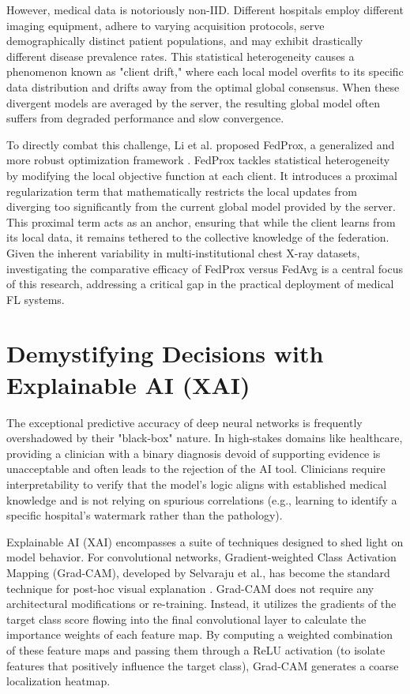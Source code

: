 \documentclass[12pt,a4paper]{report}
\begin{document}
However, medical data is notoriously non-IID. Different hospitals employ different imaging equipment, adhere to varying acquisition protocols, serve demographically distinct patient populations, and may exhibit drastically different disease prevalence rates. This statistical heterogeneity causes a phenomenon known as "client drift," where each local model overfits to its specific data distribution and drifts away from the optimal global consensus. When these divergent models are averaged by the server, the resulting global model often suffers from degraded performance and slow convergence.

To directly combat this challenge, Li et al. proposed FedProx, a generalized and more robust optimization framework \cite{li2020federated}. FedProx tackles statistical heterogeneity by modifying the local objective function at each client. It introduces a proximal regularization term that mathematically restricts the local updates from diverging too significantly from the current global model provided by the server. This proximal term acts as an anchor, ensuring that while the client learns from its local data, it remains tethered to the collective knowledge of the federation. Given the inherent variability in multi-institutional chest X-ray datasets, investigating the comparative efficacy of FedProx versus FedAvg is a central focus of this research, addressing a critical gap in the practical deployment of medical FL systems.

\section{Demystifying Decisions with Explainable AI (XAI)}

The exceptional predictive accuracy of deep neural networks is frequently overshadowed by their "black-box" nature. In high-stakes domains like healthcare, providing a clinician with a binary diagnosis devoid of supporting evidence is unacceptable and often leads to the rejection of the AI tool. Clinicians require interpretability to verify that the model's logic aligns with established medical knowledge and is not relying on spurious correlations (e.g., learning to identify a specific hospital's watermark rather than the pathology).

Explainable AI (XAI) encompasses a suite of techniques designed to shed light on model behavior. For convolutional networks, Gradient-weighted Class Activation Mapping (Grad-CAM), developed by Selvaraju et al., has become the standard technique for post-hoc visual explanation \cite{selvaraju2017gradcam}. Grad-CAM does not require any architectural modifications or re-training. Instead, it utilizes the gradients of the target class score flowing into the final convolutional layer to calculate the importance weights of each feature map. By computing a weighted combination of these feature maps and passing them through a ReLU activation (to isolate features that positively influence the target class), Grad-CAM generates a coarse localization heatmap.
\end{document}

